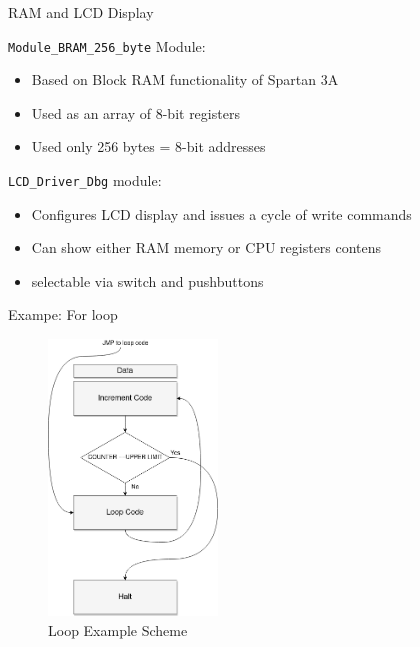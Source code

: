 \documentclass{beamer}
\newcommand{\code}[1]{
	\texttt{#1}
}
\begin{document}
  \begin{frame}{RAM and LCD Display}
    \code{Module\_BRAM\_256\_byte} Module:
\begin{itemize}
  \item Based on Block RAM functionality of Spartan 3A
  \item Used as an array of 8-bit registers
  \item Used only 256 bytes = 8-bit addresses
  \end{itemize}
  

  \code{LCD\_Driver\_Dbg} module:
  \begin{itemize}
    \item Configures LCD display and issues a cycle of write commands
    \item Can show either RAM memory or CPU registers contens
    \item selectable via switch and pushbuttons
  \end{itemize}
  
\end{frame}




  \begin{frame}{Exampe: For loop}
    \begin{figure}[hbtp]
      \centering
      \includegraphics[width=0.4\textwidth]{img/Loop.png}
      \caption{Loop Example Scheme}
      \label{fig:system}
  \end{figure}
  \end{frame}
\end{document}
